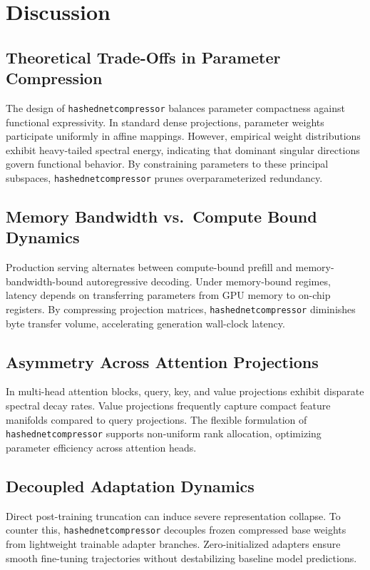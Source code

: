 \section{Discussion}

\subsection{Theoretical Trade-Offs in Parameter Compression}
The design of \texttt{hashednetcompressor} balances parameter compactness against functional expressivity. In standard dense projections, parameter weights participate uniformly in affine mappings. However, empirical weight distributions exhibit heavy-tailed spectral energy, indicating that dominant singular directions govern functional behavior. By constraining parameters to these principal subspaces, \texttt{hashednetcompressor} prunes overparameterized redundancy.

\subsection{Memory Bandwidth vs.\ Compute Bound Dynamics}
Production serving alternates between compute-bound prefill and memory-bandwidth-bound autoregressive decoding. Under memory-bound regimes, latency depends on transferring parameters from GPU memory to on-chip registers. By compressing projection matrices, \texttt{hashednetcompressor} diminishes byte transfer volume, accelerating generation wall-clock latency.

\subsection{Asymmetry Across Attention Projections}
In multi-head attention blocks, query, key, and value projections exhibit disparate spectral decay rates. Value projections frequently capture compact feature manifolds compared to query projections. The flexible formulation of \texttt{hashednetcompressor} supports non-uniform rank allocation, optimizing parameter efficiency across attention heads.

\subsection{Decoupled Adaptation Dynamics}
Direct post-training truncation can induce severe representation collapse. To counter this, \texttt{hashednetcompressor} decouples frozen compressed base weights from lightweight trainable adapter branches. Zero-initialized adapters ensure smooth fine-tuning trajectories without destabilizing baseline model predictions.

